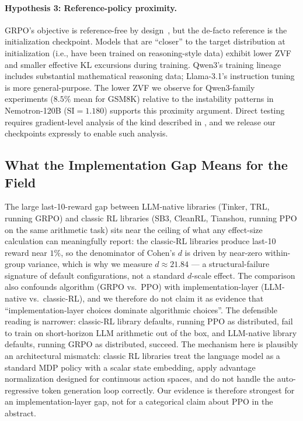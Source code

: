 \documentclass{article}
\begin{document}
\paragraph{Hypothesis 3: Reference-policy proximity.}
GRPO's objective is reference-free by design~\citep{shao2024deepseekmath},
but the de-facto reference is the initialization checkpoint.
Models that are ``closer'' to the target distribution at initialization (i.e.,
have been trained on reasoning-style data) exhibit lower ZVF and smaller
effective KL excursions during training.
Qwen3's training lineage includes substantial mathematical reasoning data;
Llama-3.1's instruction tuning is more general-purpose.
The lower ZVF we observe for Qwen3-family experiments ($8.5\%$ mean for GSM8K)
relative to the instability patterns in Nemotron-120B ($\text{SI} = 1.180$)
supports this proximity argument.
Direct testing requires gradient-level analysis of the kind described in
\citet{liu2025rlsubnetworks}, and we release our checkpoints expressly to
enable such analysis.

\subsection{What the Implementation Gap Means for the Field}
\label{sec:discuss_impl}

The large last-10-reward gap between LLM-native libraries (Tinker, TRL,
running GRPO) and classic RL libraries (SB3, CleanRL, Tianshou,
running PPO on the same arithmetic task) sits near the ceiling of
what any effect-size calculation can meaningfully report: the
classic-RL libraries produce last-10 reward near $1\%$, so the
denominator of Cohen's $d$ is driven by near-zero within-group
variance, which is why we measure $d \approx 21.84$ --- a
structural-failure signature of default configurations, not a
standard $d$-scale effect. The comparison also confounds
algorithm (GRPO vs.\ PPO) with implementation-layer (LLM-native vs.\
classic-RL), and we therefore do not claim it as evidence that
``implementation-layer choices dominate algorithmic choices''.
The defensible reading is narrower: classic-RL library defaults,
running PPO as distributed, fail to train on short-horizon LLM
arithmetic out of the box, and LLM-native library defaults,
running GRPO as distributed, succeed.
The mechanism here is plausibly an architectural mismatch: classic RL
libraries treat the language model as a standard MDP policy with a scalar
state embedding, apply advantage normalization designed for continuous action
spaces, and do not handle the auto-regressive token generation loop
correctly. Our evidence is therefore strongest for an implementation-layer gap,
not for a categorical claim about PPO in the abstract.
\end{document}
